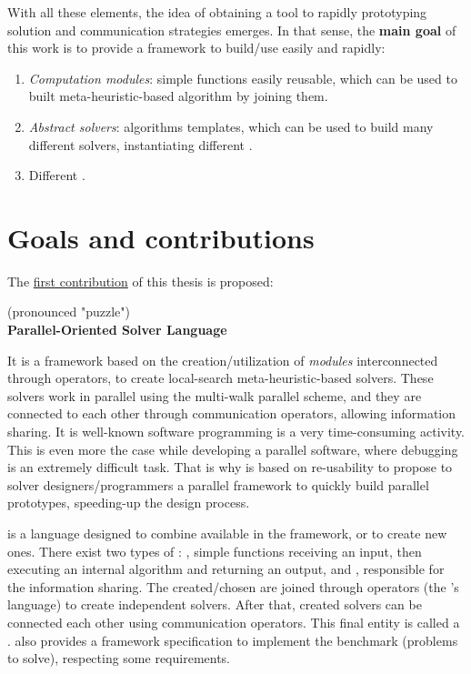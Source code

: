 With all these elements, the idea of obtaining a tool to rapidly prototyping solution and communication strategies emerges. In that sense, the \textbf{main goal} of this work is to provide a framework to build/use easily and rapidly:
\begin{enumerate}
\item \textit{Computation modules}: simple functions easily reusable, which can be used to built meta-heuristic-based algorithm by joining them.
\item \textit{Abstract solvers}: algorithms templates, which can be used to build many different solvers, instantiating different \oms.
\item Different \comstrs.
\end{enumerate} 

\section{Goals and contributions}

The \underline{first contribution} of this thesis is proposed: 
\begin{center}
\posl{} (pronounced "puzzle")\\
\textbf{Parallel-Oriented Solver Language}
\end{center}
It is a framework based on the creation/utilization of \textit{modules} interconnected through operators, to create local-search meta-heuristic-based solvers. These solvers work in parallel using the multi-walk parallel scheme, and they are connected to each other through communication operators, allowing information sharing. It is well-known software programming is a very time-consuming activity. This is even more the case while developing a parallel software, where debugging is an extremely difficult task. That is why \posl{} is based on re-usability to propose to \csp{} solver designers/programmers a parallel framework to quickly build parallel prototypes, speeding-up the design process.

\posl{} is a language designed to combine \ms{} available in the framework, or to create new ones. There exist two types of \ms{}: \oms{}, simple functions receiving an input, then executing an internal algorithm and returning an output, and \opchs{}, responsible for the information sharing.
The created/chosen \ms{} are joined through operators (the \posl's language) to create independent solvers. After that, created solvers can be connected each other using communication operators. This final entity is called a \soset. \posl{} also provides a framework specification to implement the benchmark (problems to solve), respecting some requirements.

